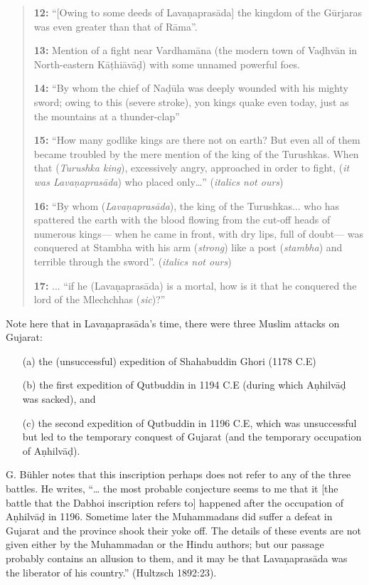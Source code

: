 \begin{quote}
\smallskip
{\bf 12:} “[Owing to some deeds of Lavaṇaprasāda] the kingdom of the Gūrjaras was even greater than that of Rāma”. 

\smallskip
{\bf 13:} Mention of a fight near Vardhamāna (the modern town of Vaḍhvān in North-eastern Kāṭhiāvāḍ) with some unnamed powerful foes.

\smallskip
{\bf 14:} “By whom the chief of Naḍūla was deeply wounded with his mighty sword; owing to this (severe stroke), yon kings quake even today, just as the mountains at a thunder-clap”

\smallskip
{\bf 15:} “How many godlike kings are there not on earth? But even all of them became troubled by the mere mention of the king of the Turushkas. When that ({\sl Turushka king}), excessively angry, approached in order to fight, ({\sl it was Lavaṇaprasāda}) who placed only…” ({\sl italics not ours})

\smallskip
{\bf 16:} “By whom ({\sl Lavaṇaprasāda}), the king of the Turushkas... who has spattered the earth with the blood flowing from the cut-off heads of numerous kings— when he came in front, with dry lips, full of doubt— was conquered at Stambha with his arm ({\sl strong}) like a post ({\sl stambha}) and terrible through the sword”. ({\sl italics not ours})

\smallskip
{\bf 17:} ... “if he (Lavaṇaprasāda) is a mortal, how is it that he conquered the lord of the Mlechchhas ({\sl sic})?”
\end{quote}

\smallskip
Note here that in Lavaṇaprasāda’s time, there were three Muslim attacks on Gujarat: 
\begin{itemize}
\itemsep=0pt
\item[(a)] the (unsuccessful) expedition of Shahabuddin Ghori  (1178 C.E) 
\item[(b)] the first expedition of Qutbuddin in 1194 C.E (during which Aṇhilvāḍ was sacked), and 
\item[(c)] the second expedition of Qutbuddin in 1196 C.E, which was unsuccessful but led to the temporary conquest of Gujarat (and the temporary occupation of Aṇhilvāḍ). 
\end{itemize}
G. Bühler notes that this inscription perhaps does not refer to any of the three battles. He writes, “… the most probable conjecture seems to me that it [the battle that the Dabhoi inscription refers to] happened after the occupation of Aṇhilvāḍ in 1196. Sometime later the Muhammadans did suffer a defeat in Gujarat and the province shook their yoke off. The details of these events are not given either by the Muhammadan or the Hindu authors; but our passage probably contains an allusion to them, and it may be that Lavaṇaprasāda was the liberator of his country.” (Hultzsch 1892:23). 

